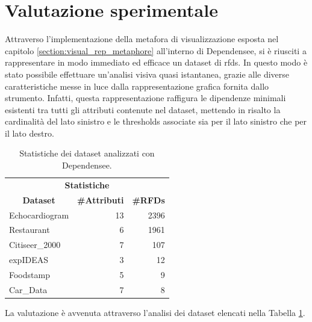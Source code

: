 \section{Valutazione sperimentale}
Attraverso l'implementazione della metafora di visualizzazione esposta nel capitolo \ref{section:visual_rep_metaphore} all'interno di Dependensee, si \`{e} riusciti a rappresentare in modo immediato ed efficace un dataset di \acrlong{rfds}. In questo modo \`{e} stato possibile effettuare un'analisi visiva quasi istantanea, grazie alle diverse caratteristiche messe in luce dalla rappresentazione grafica fornita dallo strumento. Infatti, questa rappresentazione raffigura le dipendenze minimali esistenti tra tutti gli attributi contenute nel dataset, mettendo in risalto la cardinalit\`{a} del lato sinistro e le thresholds associate sia per il lato sinistro che per il lato destro.\par
\begin{table}[ht]
\centering
\begin{tabular}{|lrr|} 
\hline
\multicolumn{3}{|c|}{\textbf{Statistiche }}                                                         \\
\multicolumn{1}{|c}{\textbf{Dataset}} & \multicolumn{1}{c}{\textbf{\#Attributi}} & \textbf{\#RFDs}  \\ 
\hline
Echocardiogram                             & 13                                       & 2396                \\
Restaurant                             & 6                                       & 1961                \\
Citiseer\_2000                        & 7                                       & 107                \\
expIDEAS                             & 3                                       & 12                \\
Foodstamp                             & 5                                       & 9                \\
Car\_Data                             & 7                                       & 8                \\
\hline
\end{tabular}
\caption{Statistiche dei dataset analizzati con Dependensee.}
\label{table:datasets_analyzed_stats}
\end{table}
La valutazione \`{e} avvenuta attraverso l'analisi dei dataset elencati nella Tabella \ref{table:datasets_analyzed_stats}.
